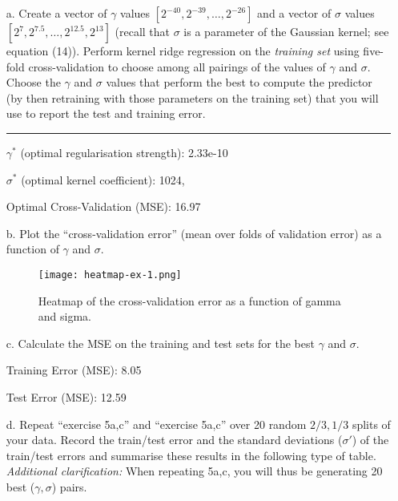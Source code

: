 \documentclass{article}
\begin{document}
\begin{enumerate}
    \item[a.] Create a vector of \(\gamma\) values \([2^{-40}, 2^{-39}, \ldots, 2^{-26}]\) and a vector of \(\sigma\) values \([2^{7}, 2^{7.5}, \ldots, 2^{12.5}, 2^{13}]\) (recall that \(\sigma\) is a parameter of the Gaussian kernel; see equation (14)). Perform kernel ridge regression on the \emph{training set} using five-fold cross-validation to choose among all pairings of the values of \(\gamma\) and \(\sigma\). Choose the \(\gamma\) and \(\sigma\) values that perform the best to compute the predictor (by then retraining with those parameters on the training set) that you will use to report the test and training error.

    \noindent\textcolor{gray}{\rule{0.1\linewidth}{0.5pt}}
    
    \(\gamma^*\)  (optimal regularisation strength): 2.33e-10
    
     \(\sigma^*\)  (optimal kernel coefficient): 1024,
     
    Optimal Cross-Validation (MSE): 16.97

    
    \item[b.] Plot the ``cross-validation error'' (mean over folds of validation error) as a function of \(\gamma\) and \(\sigma\).

    \begin{figure}[H]
        \centering
        \texttt{[image: heatmap-ex-1.png]}
        \caption{Heatmap of the cross-validation error as a function of gamma and sigma.}
        \label{heatmap}
    \end{figure}
    
    \item[c.] Calculate the MSE on the training and test sets for the best \(\gamma\) and \(\sigma\).

    
    Training Error (MSE): 8.05
    
    Test Error (MSE): 12.59
    
    \item[d.] Repeat ``exercise 5a,c'' and ``exercise 5a,c'' over 20 random \(2/3,1/3\) splits of your data. Record the train/test error and the standard deviations (\(\sigma'\)) of the train/test errors and summarise these results in the following type of table. \emph{Additional clarification:} When repeating 5a,c, you will thus be generating 20 best (\(\gamma, \sigma\)) pairs.
\end{enumerate}
\end{document}
